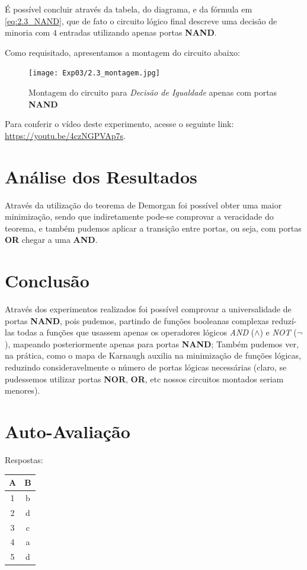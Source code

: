 \documentclass[12pt]{article}
\begin{document}
É possível concluir através da tabela, do diagrama, e da fórmula em
\ref{eq:2.3_NAND}, que de fato o circuito lógico final descreve uma decisão de
minoria com \(4\) entradas utilizando apenas portas \textbf{NAND}.

Como requisitado, apresentamos a montagem do circuito abaixo:

\begin{figure}[H]
    \centering
    \texttt{[image: Exp03/2.3\_montagem.jpg]}
    \caption{Montagem do circuito para \textit{Decisão de Igualdade} apenas com portas \textbf{NAND}}
    \label{fig:decisao_igualdade_montagem}
\end{figure}

Para conferir o vídeo deste experimento, acesse o seguinte link:
\href{https://youtu.be/4czNGPVAp7s}{https://youtu.be/4czNGPVAp7s}.
\\[2em]

\section{Análise dos Resultados}
\label{sec:Resultados}

Através da utilização do teorema de Demorgan foi possível obter uma maior
minimização, sendo que indiretamente pode-se comprovar a veracidade do teorema,
e também pudemos aplicar a transição entre portas, ou seja, com portas \textbf{OR}
chegar a uma \textbf{AND}.

\section{Conclusão}
\label{sec:Conclusao}

Através dos experimentos realizados foi possível comprovar a universalidade de
portas \textbf{NAND}, pois pudemos, partindo de funções booleanas complexas
reduzí-las todas a funções que usassem apenas os operadores lógicos \emph{AND}
(\(\land\)) e \emph{NOT} (\(\lnot\)), mapeando posteriormente apenas para portas
\textbf{NAND}; Também pudemos ver, na prática, como o mapa de Karnaugh auxilia
na minimização de funções lógicas, reduzindo consideravelmente o número de
portas lógicas necessárias (claro, se pudessemos utilizar portas \textbf{NOR},
\textbf{OR}, etc nossos circuitos montados seriam menores).

\nocite{*}



\newpage
\section*{Auto-Avaliação}

Respostas:

\begin{table}[H]
    \begin{tabular}{|c|c|} \hline
    \textbf{A} & \textbf{B}\\
    \hline
    1 & b \\ \hline
    2 & d \\ \hline
    3 & c \\ \hline
    4 & a \\ \hline
    5 & d \\ \hline
    \end{tabular}
\end{table}
\end{document}
